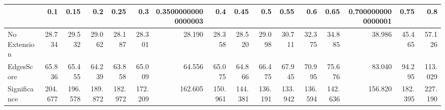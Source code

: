 \begin{tabular}{lrrrrrrrrrrrrrrr}
\toprule
{} &     0.1 &    0.15 &     0.2 &    0.25 &     0.3 & 0.35000000000000003 &     0.4 &    0.45 &     0.5 &    0.55 &     0.6 &    0.65 & 0.7000000000000001 &    0.75 &     0.8 \\
\midrule
No Extension &  28.734 &  29.532 &  29.062 &  28.187 &  28.301 &              28.190 &  28.358 &  28.520 &  29.098 &  30.711 &  32.375 &  34.885 &             38.986 &  45.465 &  57.126 \\
EdgesScore   &  65.836 &  65.455 &  64.239 &  63.858 &  65.009 &              64.556 &  65.075 &  64.866 &  66.475 &  67.945 &  70.995 &  75.676 &             83.040 &  94.295 & 113.029 \\
Significance & 204.677 & 196.578 & 189.872 & 182.972 & 172.209 &             162.605 & 150.961 & 144.381 & 136.191 & 133.942 & 136.594 & 142.636 &            156.820 & 182.395 & 227.190 \\
\bottomrule
\end{tabular}
